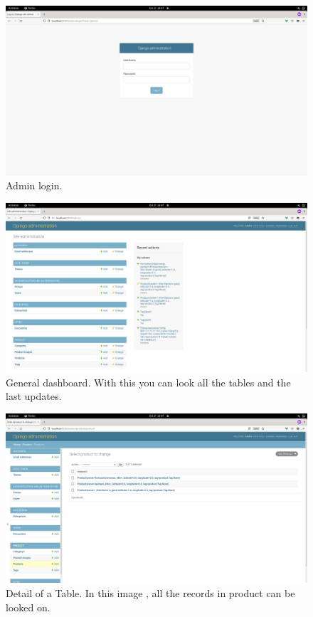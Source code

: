 \documentclass[./main.tex]{subfiles}
\begin{document}
\begin{figure}[H]
	\centering
	\includegraphics[width=0.9\linewidth]{img/admin-img-1.png}
	\caption{Admin login.}
	\label{fig:admin-1}
\end{figure}

\begin{figure}[H]
	\centering
	\includegraphics[width=0.9\linewidth]{img/admin-img-2.png}
	\caption{General dashboard. With this you can look all the tables and the last updates.}
	\label{fig:admin-2}
\end{figure}

\begin{figure}[H]
	\centering
	\includegraphics[width=0.9\linewidth]{img/admin-img-3.png}
	\caption{Detail of a Table. In this image , all the records in product can be looked on.}
	\label{fig:admin-3}
\end{figure}
\end{document}
